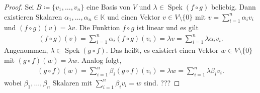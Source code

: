 \documentclass[draft,a5paper]{article}
\theoremstyle{remark}
\DeclareMathOperator{\Spek}{Spek}
\begin{document}
\begin{proof}
  Sei \(B \coloneq \{v_{1}, \ldots, v_{n}\}\) eine Basis von \(V\) und
  \(\lambda \in \Spek(f \circ g)\) beliebig.  Dann existieren Skalaren
  \(\alpha_{1}, \ldots, \alpha_{n} \in \mathbb{K} \) und einen Vektor
  \(v \in V \setminus \{ 0 \}\) mit \(v = \sum_{i=1}^{n}{\alpha_{i}v_{i}}\) und
  \((f \circ g)(v) = \lambda v\).  Die Funktion \(f \circ g\) ist linear und es gilt
  \begin{align*}
    (f \circ g)(v) = \sum_{i=1}^{n}{\alpha_{i}(f \circ g)(v_{i})} = \lambda v =
    \sum_{i=1}^{n}{\lambda \alpha_{i} v_{i}}.
  \end{align*}
  Angenommen, \(\lambda \in \Spek(g \circ f)\).  Das heißt, es existiert einen
  Vektor \(w \in V \setminus \{0\}\) mit \((g \circ f)(w) = \lambda w\).  Analog folgt,
  \begin{align*}
    (g \circ f)(w) = \sum_{i=1}^{n}{\beta_{i}(g \circ f)(v_{i})} = \lambda w =
    \sum_{i=1}^{n}{\lambda \beta_{i} v_{i}}.
  \end{align*}
  wobei \(\beta_{1}, \ldots, \beta_{n}\) Skalaren mit \(\sum_{i=1}^{n}{\beta_{i}v_{i}} =
  w\) sind. ???
\end{proof}
\end{document}
